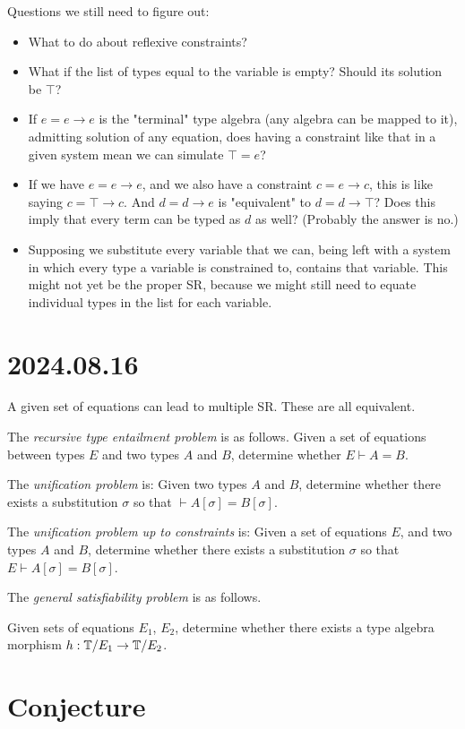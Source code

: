 \documentclass{scrartcl}
\begin{document}
Questions we still need to figure out:
\begin{itemize}
  \item What to do about reflexive constraints?
  \item What if the list of types equal to the variable is empty?
  Should its solution be $\top$?
  \item If $e = e \to e$ is the "terminal" type algebra
  (any algebra can be mapped to it), admitting solution of any equation,
  does having a constraint like that in a given system mean we can simulate
  $\top = e$?
  \item If we have $e = e \to e$, and we also have a constraint $c = e \to c$,
  this is like saying $c = \top \to c$.  And $d = d \to e$ is "equivalent" to
   $d = d \to \top$?  Does this imply that every term can be typed as $d$ as well?
   (Probably the answer is no.)
   \item Supposing we substitute every variable that we can,
   being left with a system in which every type a variable is constrained to,
   contains that variable.  This might not yet be the proper SR, because we
   might still need to equate individual types in the list for each variable.
\end{itemize}

\section{2024.08.16}

A given set of equations can lead to multiple SR.  These are all equivalent.

The \emph{recursive type entailment problem} is as follows.
Given a set of equations between types $E$ and two types $A$ and $B$,
determine whether $E \vdash A = B$.

The \emph{unification problem} is: Given two types $A$ and $B$,
determine whether there exists a substitution $\sigma$
so that $\vdash A[\sigma] = B[\sigma]$.

The \emph{unification problem up to constraints} is: Given a set of equations $E$,
and two types $A$ and $B$, determine whether there exists a substitution $\sigma$
so that $E \vdash A[\sigma] = B[\sigma]$.


The \emph{general satisfiability problem} is as follows.

Given sets of equations $E_1$, $E_2$, determine whether there exists
a type algebra morphism $h : \mathbb{T}/E_1 \to \mathbb{T}/E_2$.

\section{Conjecture}
\end{document}

